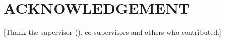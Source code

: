 \chapter*{ACKNOWLEDGEMENT}
[Thank the supervisor (\supervisor), co-supervisors and others who contributed.]
